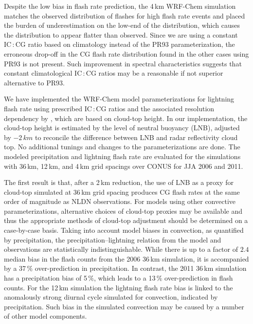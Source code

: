 Despite the low bias in flash rate prediction, the 4\,\unit{km} WRF-Chem
simulation matches the observed distribution of flashes for high flash rate
events and placed the burden of underestimation on the low-end of the
distribution, which causes the distribution to appear flatter than observed.
Since we are using a constant IC\,:\,CG ratio based on
\citet{Boccippio:2001ys} climatology instead of the PR93 parameterization,
the erroneous drop-off in the CG flash rate distribution found in the other
cases using PR93 is not present. Such improvement in spectral characteristics
suggests that constant climatological IC\,:\,CG ratios may be a reasonable if
not superior alternative to PR93.

\conclusions\label{sec:lightning/conclusions}

We have implemented the WRF-Chem model parameterizations for lightning
flash rate using prescribed IC\,:\,CG ratios and the associated resolution dependency by
\citet{Price:1992wb,Price:1993fk,Price:1994fk}, which are based on cloud-top
height. In our implementation, the cloud-top height is estimated by the level
of neutral buoyancy (LNB), adjusted by $-2\,\unit{km}$ to reconcile the
difference between LNB and radar reflectivity cloud top. No additional
tunings and changes to the parameterizations are done. The modeled
precipitation and \mbox{lightning} flash rate are evaluated for the simulations with
36\,\unit{km}, 12\,\unit{km}, and 4\,\unit{km} grid spacings over CONUS for
JJA 2006 and 2011.

The first result is that, after a 2\,\unit{km} reduction, the use of LNB as a
proxy for cloud-top simulated at 36\,\unit{km} grid spacing produces CG flash
rates at the same order of magnitude as NLDN observations. For models using
other convective parameterizations, alternative choices of cloud-top proxies
may be available and thus the appropriate methods of cloud-top adjustment
should be determined on a case-by-case basis. Taking into account model
biases in convection, as quantified by precipitation, the
precipitation--lightning relation from the model and observations are
statistically indistinguishable. While there is up to a factor of $2.4$
median bias in the flash counts from the 2006 36\,\unit{km} simulation, it is
accompanied by a 37\,{\%} over-prediction in precipitation. In contrast, the
2011 36\,\unit{km} simulation has a precipitation bias of 5\,{\%}, which
leads to a 13\,{\%} over-prediction in flash counts. For the 12\,\unit{km}
simulation the lightning flash rate bias is linked to the anomalously strong
diurnal cycle simulated for convection, indicated by precipitation. Such bias
in the simulated convection may be caused by a number of other model
components.

